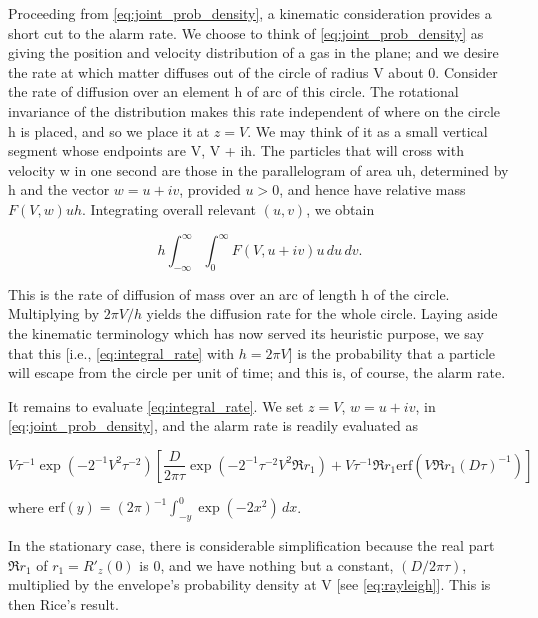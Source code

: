 \documentclass[10pt,twocolumn]{article}
\theoremstyle{definition}
\begin{document}
Proceeding from \eqref{eq:joint_prob_density}, a kinematic consideration provides a short cut to the alarm rate. We choose to think of \eqref{eq:joint_prob_density} as giving the position and velocity distribution of a gas in the plane; and we desire the rate at which matter diffuses out of the circle of radius V about 0. Consider the rate of diffusion over an element h of arc of this circle. The rotational invariance of the distribution makes this rate independent of where on the circle h is placed, and so we place it at $z = V$. We may think of it as a small vertical segment whose endpoints are V, V + ih. The particles that will cross with velocity w in one second are those in the parallelogram of area uh, determined by h and the vector $w = u + iv$, provided $u > 0$, and hence have relative mass $F(V, w)uh$. Integrating overall relevant $(u, v)$, we obtain

\begin{equation}
\label{eq:integral_rate}
h \int_{-\infty}^{\infty} \int_{0}^{\infty} F(V, u + iv)u \, du \, dv.
\end{equation}

This is the rate of diffusion of mass over an arc of length h of the circle. Multiplying by $2\pi V/h$ yields the diffusion rate for the whole circle. Laying aside the kinematic terminology which has now served its heuristic purpose, we say that this [i.e., \eqref{eq:integral_rate} with $h = 2\pi V$] is the probability that a particle will escape from the circle per unit of time; and this is, of course, the alarm rate.

It remains to evaluate \eqref{eq:integral_rate}. We set $z = V$, $w = u + iv$, in \eqref{eq:joint_prob_density}, and the alarm rate is readily evaluated as

\begin{equation}
\label{eq:alarm_rate}
V\tau^{-1} \exp (-2^{-1}V^2\tau^{-2}) \left[\frac{D}{2\pi\tau} \exp (-2^{-1}\tau^{-2}V^2\mathfrak{R}r_1) + V\tau^{-1}\mathfrak{R}r_1 \text{erf} (V\mathfrak{R}r_1(D\tau)^{-1})\right]
\end{equation}

where $\text{erf} (y) = (2\pi)^{-1} \int_{-y}^0 \exp (-2x^2) \, dx$.

In the stationary case, there is considerable simplification because the real part $\mathfrak{R}r_1$ of $r_1 = R'_z(0)$ is 0, and we have nothing but a constant, $(D/2\pi\tau)$, multiplied by the envelope's probability density at V [see \eqref{eq:rayleigh}]. This is then Rice's result.
\end{document}
